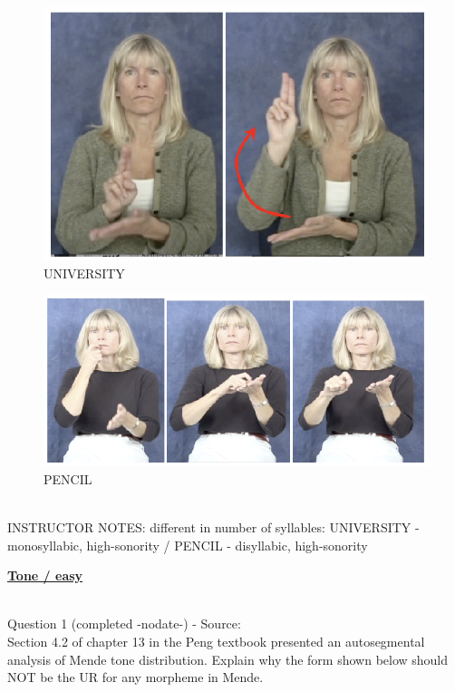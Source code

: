 \documentclass[12pt]{article}
\begin{document}
\begin{figure}[H]
\includegraphics{../images/asl_university.png}
\caption{UNIVERSITY}
\end{figure}
\begin{figure}[H]
\includegraphics{../images/asl_pencil.png}
\caption{PENCIL}
\end{figure}

~\\
INSTRUCTOR NOTES: different in number of syllables: UNIVERSITY - monosyllabic, high-sonority / PENCIL - disyllabic, high-sonority


\newpage\textbf{\underline{\huge Tone / easy\\}}

~\\

{\large Question 1} (completed -nodate-) - Source: \\

Section 4.2 of chapter 13 in the Peng textbook presented an autosegmental analysis of Mende tone distribution. Explain why the form shown below should NOT be the UR for any morpheme in Mende.\\
\end{document}
